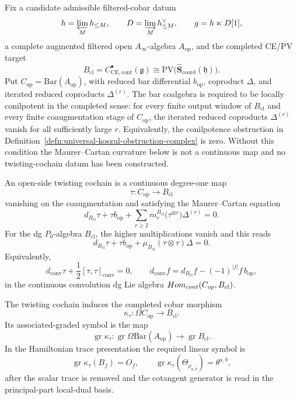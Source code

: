 \begin{defn}
\label{defn:universal-open-side-twisting-cochain}
  Fix a candidate admissible filtered-cobar datum
  \[
    \mathfrak h=\varprojlim_M\mathfrak h_{\leq M},\qquad
    D=\varinjlim_M\mathfrak h_{\leq M}^{\vee},\qquad
    \mathfrak g=\mathfrak h\ltimes D[1],
  \]
  a complete augmented filtered open \(A_\infty\)-algebra
  \(A_{\mathrm{op}}\), and the completed CE/PV target
  \[
    B_{\mathrm{cl}}
      =
      C^\bullet_{\mathrm{CE},\mathrm{cont}}(\mathfrak g)
      \cong
      \mathrm{PV}\bigl(\widehat{\mathbf S}_{\mathrm{coord}}(\mathfrak h)\bigr).
  \]
  Put \(C_{\mathrm{op}}=\mathrm{Bar}(A_{\mathrm{op}})\), with reduced bar
  differential \(b_{\mathrm{op}}\), coproduct \(\Delta\), and iterated
  reduced coproducts \(\Delta^{(r)}\).  The bar coalgebra is required to
  be locally conilpotent in the completed sense: for every finite output
  window of \(B_{\mathrm{cl}}\) and every finite coaugmentation stage of
  \(C_{\mathrm{op}}\), the iterated reduced coproducts \(\Delta^{(r)}\)
  vanish for all sufficiently large \(r\).  Equivalently, the
  conilpotence obstruction in
  Definition~\ref{defn:universal-koszul-obstruction-complex} is zero.
  Without this condition the Maurer--Cartan curvature below is not a
  continuous map and no twisting-cochain datum has been constructed.

  An open-side twisting cochain is a continuous degree-one map
  \[
    \tau\colon C_{\mathrm{op}}\longrightarrow B_{\mathrm{cl}}
  \]
  vanishing on the coaugmentation and satisfying the Maurer--Cartan
  equation
  \[
    d_{B_{\mathrm{cl}}}\tau+\tau b_{\mathrm{op}}
      +\sum_{r\geq2}
        m_r^{B_{\mathrm{cl}}}\bigl(\tau^{\otimes r}\bigr)
        \Delta^{(r)}
      =0 .
  \]
  For the dg \(P_0\)-algebra \(B_{\mathrm{cl}}\), the higher
  multiplications vanish and this reads
  \[
    d_{B_{\mathrm{cl}}}\tau+\tau b_{\mathrm{op}}
      +\mu_{B_{\mathrm{cl}}}(\tau\otimes\tau)\Delta=0 .
  \]
  Equivalently,
  \[
    d_{\mathrm{conv}}\tau+\frac12[\tau,\tau]_{\mathrm{conv}}=0,\qquad
    d_{\mathrm{conv}}f=d_{B_{\mathrm{cl}}}f
      -(-1)^{|f|}f\,b_{\mathrm{op}},
  \]
  in the continuous convolution dg Lie algebra
  \(\Hom_{\mathrm{cont}}(C_{\mathrm{op}},B_{\mathrm{cl}})\).

  The twisting cochain induces the completed cobar morphism
  \[
    \kappa_\tau\colon
    \Omega C_{\mathrm{op}}
    \longrightarrow B_{\mathrm{cl}}.
  \]
  Its associated-graded symbol is the map
  \[
    \operatorname{gr}\kappa_\tau\colon
    \operatorname{gr}\Omega\mathrm{Bar}(A_{\mathrm{op}})
    \longrightarrow
    \operatorname{gr}B_{\mathrm{cl}}.
  \]
  In the Hamiltonian trace presentation the required linear symbol is
  \[
    \operatorname{gr}\kappa_\tau(B_f)=O_f,\qquad
    \operatorname{gr}\kappa_\tau(\Theta_{\rho_{a,b}})=\theta^{a,b},
  \]
  after the scalar trace is removed and the cotangent generator is read
  in the principal-part local-dual basis.
\end{defn}

